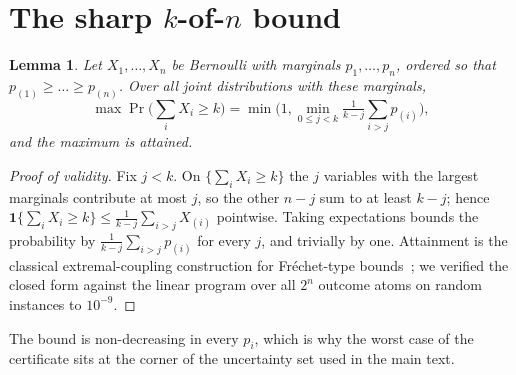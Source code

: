\documentclass[conference,compsoc]{IEEEtran}
\newtheorem{lemma}{Lemma}
\begin{document}
\section{The sharp \texorpdfstring{$k$-of-$n$}{k-of-n} bound}\label{app:kofn}
\begin{lemma}\label{lem:kofn}
Let $X_1,\dots,X_n$ be Bernoulli with marginals $p_1,\dots,p_n$, ordered so that
$p_{(1)}\ge\dots\ge p_{(n)}$. Over all joint distributions with these marginals,
\[\max\Pr\Big(\sum_i X_i\ge k\Big)=\min\Big(1,\min_{0\le j<k}\tfrac{1}{k-j}
\textstyle\sum_{i>j}p_{(i)}\Big),\]
and the maximum is attained.
\end{lemma}
\begin{proof}[Proof of validity]
Fix $j<k$. On $\{\sum_i X_i\ge k\}$ the $j$ variables with the largest marginals
contribute at most $j$, so the other $n-j$ sum to at least $k-j$; hence
$\mathbf 1\{\sum_i X_i\ge k\}\le\frac{1}{k-j}\sum_{i>j}X_{(i)}$ pointwise. Taking
expectations bounds the probability by $\frac{1}{k-j}\sum_{i>j}p_{(i)}$ for every $j$,
and trivially by one. Attainment is the classical extremal-coupling construction for
Fr\'echet-type bounds~\cite{ruschendorf1991}; we verified the closed form against the
linear program over all $2^n$ outcome atoms on random instances to $10^{-9}$.
\end{proof}
The bound is non-decreasing in every $p_i$, which is why the worst case of the
certificate sits at the corner of the uncertainty set used in the main text.
\end{document}
